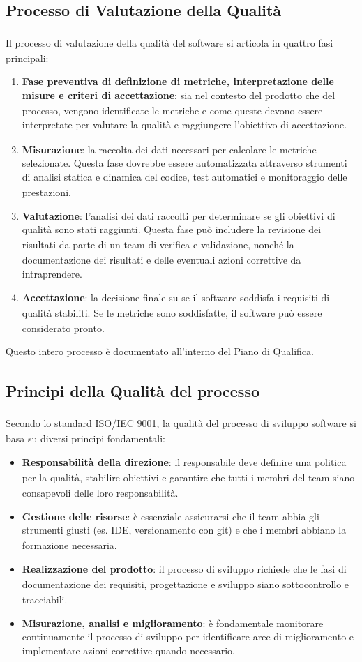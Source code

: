 \documentclass[a4paper,11pt]{article}
\newcommand{\G}{\textsubscript{\scalebox{0.6}{\textbf{G}}}}
\begin{document}
\subsection{Processo di Valutazione della Qualità\G{}}
Il processo di valutazione della qualità\G{} del software si articola in quattro fasi principali:
\begin{enumerate}
    \item \textbf{Fase preventiva di definizione di metriche, interpretazione delle misure e criteri di accettazione}: sia nel contesto del prodotto\G{} che del processo, vengono identificate le metriche e come queste devono essere interpretate per valutare la qualità\G{} e raggiungere l'obiettivo di accettazione.
    \item \textbf{Misurazione}: la raccolta dei dati necessari per calcolare le metriche selezionate. Questa fase dovrebbe essere automatizzata attraverso strumenti di analisi statica e dinamica del codice, test\G{} automatici e monitoraggio delle prestazioni.
    \item \textbf{Valutazione}: l'analisi dei dati raccolti per determinare se gli obiettivi di qualità\G{} sono stati raggiunti. Questa fase può includere la revisione dei risultati da parte di un team di verifica\G{} e validazione\G{}, nonché la documentazione dei risultati e delle eventuali azioni correttive da intraprendere.
    \item \textbf{Accettazione}: la decisione finale su se il software soddisfa i requisiti\G{} di qualità\G{} stabiliti. Se le metriche sono soddisfatte, il software può essere considerato pronto.
\end{enumerate}
Questo intero processo è documentato all'interno del \href{https://bugbustersunipd.github.io/DocumentazioneSWE/PB/PIANO%20DI%20QUALIFICA/Piano%20di%20Qualifica.pdf}{Piano di Qualifica\G{}}.
\subsection{Principi della Qualità\G{} del processo}
Secondo lo standard ISO/IEC 9001, la qualità\G{} del processo di sviluppo software si basa su diversi principi fondamentali:
\begin{itemize}
    \item \textbf{Responsabilità della direzione}: il responsabile\G{} deve definire una politica per la qualità\G{}, stabilire obiettivi e garantire che tutti i membri del team siano consapevoli delle loro responsabilità.
    \item \textbf{Gestione delle risorse}: è essenziale assicurarsi che il team abbia gli strumenti giusti (es. IDE, versionamento\G{} con git) e che i membri abbiano la formazione necessaria.
    \item \textbf{Realizzazione del prodotto\G{}}: il processo di sviluppo richiede che le fasi di documentazione dei requisiti\G{}, progettazione e sviluppo siano sottocontrollo e tracciabili.
    \item \textbf{Misurazione, analisi e miglioramento}: è fondamentale monitorare continuamente il processo di sviluppo per identificare aree di miglioramento e implementare azioni correttive quando necessario.
\end{itemize}
\end{document}
